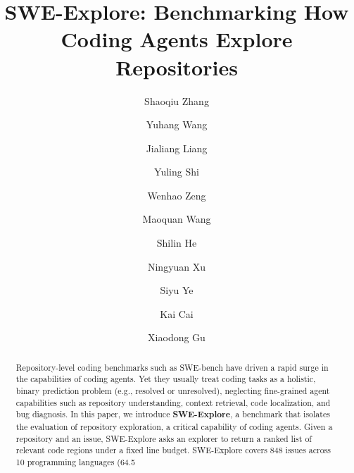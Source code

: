 \documentclass{llmxive}
\title{SWE-Explore: Benchmarking How Coding Agents Explore Repositories}
\author{Shaoqiu Zhang \and Yuhang Wang \and Jialiang Liang \and Yuling Shi \and Wenhao Zeng \and Maoquan Wang \and Shilin He \and Ningyuan Xu \and Siyu Ye \and Kai Cai \and Xiaodong Gu}
\begin{document}
\maketitle
\begin{abstract}
Repository-level coding benchmarks such as SWE-bench have driven a rapid surge in the capabilities of coding agents. Yet they usually treat coding tasks as a holistic, binary prediction problem (e.g., resolved or unresolved), neglecting fine-grained agent capabilities such as repository understanding, context retrieval, code localization, and bug diagnosis. In this paper, we introduce \textbf{SWE-Explore}, a benchmark that isolates the evaluation of repository exploration, a critical capability of coding agents. Given a repository and an issue, SWE-Explore asks an explorer to return a ranked list of relevant code regions under a fixed line budget. SWE-Explore covers 848 issues across 10 programming languages (64.5%
\end{abstract}
\end{document}
